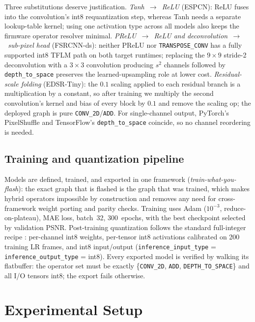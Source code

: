\documentclass[conference,a4paper]{IEEEtran}
\begin{document}
Three substitutions deserve justification. \emph{Tanh~$\rightarrow$~ReLU}
(ESPCN): ReLU fuses into the convolution's int8 requantization step, whereas
Tanh needs a separate lookup-table kernel; using one activation type across
all models also keeps the firmware operator resolver minimal.
\emph{PReLU~$\rightarrow$~ReLU and deconvolution~$\rightarrow$~sub-pixel
head} (FSRCNN-ds): neither PReLU nor \texttt{TRANSPOSE\_CONV} has a
fully supported int8 TFLM path on both target runtimes; replacing the
$9{\times}9$ stride-2 deconvolution with a $3{\times}3$ convolution
producing $s^2$ channels followed by \texttt{depth\_to\_space} preserves the
learned-upsampling role at lower cost. \emph{Residual-scale folding}
(EDSR-Tiny): the $0.1$ scaling applied to each residual branch is a
multiplication by a constant, so after training we multiply the second
convolution's kernel and bias of every block by $0.1$ and remove the scaling
op; the deployed graph is pure \texttt{CONV\_2D}/\texttt{ADD}. For
single-channel output, PyTorch's PixelShuffle and TensorFlow's
\texttt{depth\_to\_space} coincide, so no channel reordering is needed.

\subsection{Training and quantization pipeline}
Models are defined, trained, and exported in one framework
(\emph{train-what-you-flash}): the exact graph that is flashed is the graph
that was trained, which makes hybrid operators impossible by construction
and removes any need for cross-framework weight porting and parity checks.
Training uses Adam ($10^{-3}$, reduce-on-plateau), MAE loss, batch~32,
300~epochs, with the best checkpoint selected by validation PSNR.
Post-training quantization follows the standard full-integer recipe
\cite{jacob2018quantization}: per-channel int8 weights, per-tensor int8
activations calibrated on 200 training LR frames, and int8 input/output
(\texttt{inference\_input\_type} = \texttt{inference\_output\_type} =
int8). Every exported model is verified by walking its flatbuffer: the
operator set must be exactly \{\texttt{CONV\_2D}, \texttt{ADD},
\texttt{DEPTH\_TO\_SPACE}\} and all I/O tensors int8; the export fails
otherwise.

\section{Experimental Setup}
\end{document}
